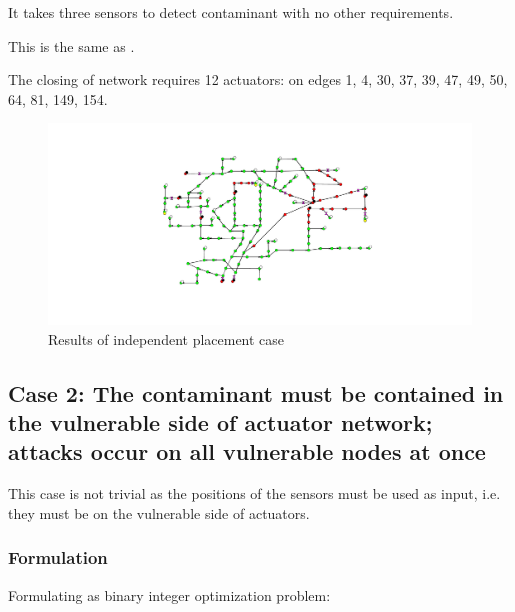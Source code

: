 \documentclass[authoryear,preprint,review,12pt]{elsarticle}
\begin{document}
It takes three sensors to detect contaminant with no other requirements.

This is the same as \cite{Palleti2016246}.

The closing of network requires 12 actuators: on edges 1, 4, 30, 37,
39, 47, 49, 50, 64, 81, 149, 154.

\begin{figure}[h]
\begin{centering}
\includegraphics[width=\linewidth]{images/multiobj_indep}\caption{Results of independent placement case}

\par\end{centering}

\end{figure}







\subsection*{Case 2: The contaminant must be contained in the vulnerable side
of actuator network; attacks occur on all vulnerable nodes at once}

This case is not trivial as the positions of the sensors must be used
as input, i.e. they must be on the vulnerable side of actuators.


\subsubsection*{Formulation}

Formulating as binary integer optimization problem:
\end{document}
